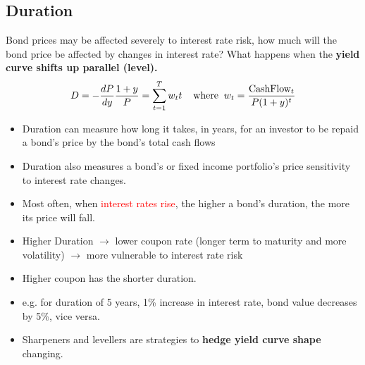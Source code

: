 \begin{multicols}{2}
\subsection{Duration}
Bond prices may be affected severely to interest rate risk, how much will the bond price be affected by changes in interest rate? What happens when the \textbf{yield curve shifts up parallel (level).}
\begin{gather*}
    D = -\frac{dP}{dy}\frac{1+y}{P} = \sum_{t=1}^{T}w_tt\hspace*{0.4cm}\text{where}\hspace*{0.2cm}w_t = \frac{\text{CashFlow}_t}{P(1+y)^t}
\end{gather*}
\begin{itemize}
    \item Duration can measure how long it takes, in years, for an investor to be repaid a bond's price by the bond's total cash flows
    \item Duration also measures a bond's or fixed income portfolio's price sensitivity to interest rate changes.
    \item Most often, when \textcolor{red}{interest rates rise}, the higher a bond's duration, the more its price will fall.
    \item Higher Duration $\rightarrow$ lower coupon rate (longer term to maturity and more volatility) $\rightarrow$ more vulnerable to interest rate risk
    \item Higher coupon has the shorter duration. 
    \item e.g. for duration of 5 years, 1\% increase in interest rate, bond value decreases by 5\%, vice versa.
    \item Sharpeners and levellers are strategies to \textbf{hedge yield curve shape} changing. 
\end{itemize}


\end{multicols}